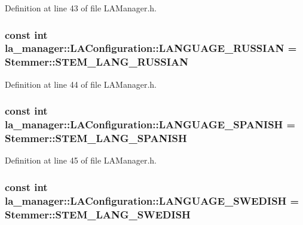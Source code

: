 Definition at line 43 of file LAManager.h.\hypertarget{classla__manager_1_1LAConfiguration_391aade71f995d9f4e09e50a341c3cbf}{
\subsubsection[{LANGUAGE\_\-RUSSIAN}]{\setlength{\rightskip}{0pt plus 5cm}const int {\bf la\_\-manager::LAConfiguration::LANGUAGE\_\-RUSSIAN} = Stemmer::STEM\_\-LANG\_\-RUSSIAN}}
\label{classla__manager_1_1LAConfiguration_391aade71f995d9f4e09e50a341c3cbf}




Definition at line 44 of file LAManager.h.\hypertarget{classla__manager_1_1LAConfiguration_cba69eb692010c894d4b3932c02ffe00}{
\subsubsection[{LANGUAGE\_\-SPANISH}]{\setlength{\rightskip}{0pt plus 5cm}const int {\bf la\_\-manager::LAConfiguration::LANGUAGE\_\-SPANISH} = Stemmer::STEM\_\-LANG\_\-SPANISH}}
\label{classla__manager_1_1LAConfiguration_cba69eb692010c894d4b3932c02ffe00}




Definition at line 45 of file LAManager.h.\hypertarget{classla__manager_1_1LAConfiguration_a72891063ae53484e3c962dbf0fd566d}{
\subsubsection[{LANGUAGE\_\-SWEDISH}]{\setlength{\rightskip}{0pt plus 5cm}const int {\bf la\_\-manager::LAConfiguration::LANGUAGE\_\-SWEDISH} = Stemmer::STEM\_\-LANG\_\-SWEDISH}}
\label{classla__manager_1_1LAConfiguration_a72891063ae53484e3c962dbf0fd566d}




